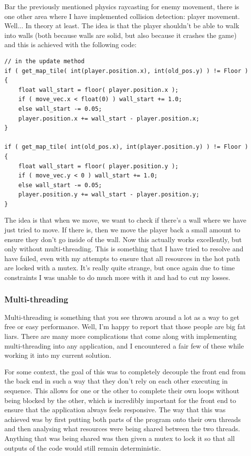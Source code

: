 \documentclass{article}
\begin{document}
Bar the previously mentioned physics raycasting for enemy movement, there is one
other area where I have implemented collision detection: player movement.
Well... In theory at least. The idea is that the player shouldn't be able to
walk into walls (both because walls are solid, but also because it crashes the
game) and this is achieved with the following code:

\begin{verbatim}
// in the update method
if ( get_map_tile( int(player.position.x), int(old_pos.y) ) != Floor ) {
    float wall_start = floor( player.position.x );
    if ( move_vec.x < float(0) ) wall_start += 1.0;
    else wall_start -= 0.05;
    player.position.x += wall_start - player.position.x;
}

if ( get_map_tile( int(old_pos.x), int(player.position.y) ) != Floor ) {
    float wall_start = floor( player.position.y );
    if ( move_vec.y < 0 ) wall_start += 1.0;
    else wall_start -= 0.05;
    player.position.y += wall_start - player.position.y;
}
\end{verbatim}

The idea is that when we move, we want to check if there's a wall where we have
just tried to move. If there is, then we move the player back a small amount to
ensure they don't go inside of the wall. Now this actually works excellently,
but only without multi-threading. This is something that I have tried to resolve
and have failed, even with my attempts to ensure that all resources in the hot
path are locked with a mutex. It's really quite strange, but once again due to
time constraints I was unable to do much more with it and had to cut my losses.

\subsubsection{Multi-threading}
Multi-threading is something that you see thrown around a lot as a way to get
free or easy performance. Well, I'm happy to report that those people are big
fat liars. There are many more complications that come along with implementing
multi-threading into any application, and I encountered a fair few of these
while working it into my current solution.

For some context, the goal of this was to completely decouple the front end from
the back end in such a way that they don't rely on each other executing in
sequence. This allows for one or the other to complete their own loops without
being blocked by the other, which is incredibly important for the front end to
ensure that the application always feels responsive. The way that this was
achieved was by first putting both parts of the program onto their own threads
and then analysing what resources were being shared between the two threads.
Anything that was being shared was then given a mutex to lock it so that all
outputs of the code would still remain deterministic.
\end{document}
